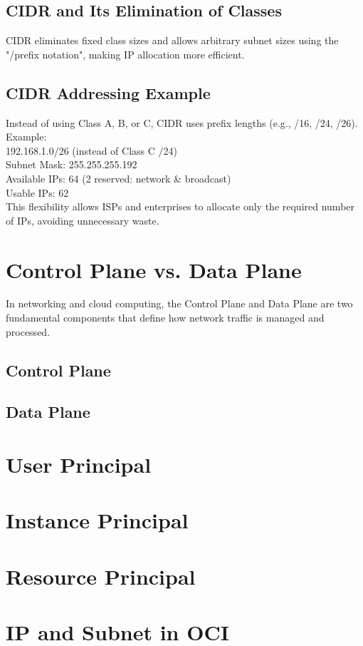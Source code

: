 \documentclass[../main.tex]{subfiles}
\begin{document}
\subsection{CIDR and Its Elimination of Classes}
CIDR eliminates fixed class sizes and allows arbitrary subnet sizes using the "/prefix notation", making IP allocation more efficient.
\subsection{CIDR Addressing Example}
Instead of using Class A, B, or C, CIDR uses prefix lengths (e.g., /16, /24, /26).
Example:\\
192.168.1.0/26 (instead of Class C /24)\\
Subnet Mask: 255.255.255.192\\
Available IPs: 64 (2 reserved: network \& broadcast)\\
Usable IPs: 62\\
This flexibility allows ISPs and enterprises to allocate only the required number of IPs, avoiding unnecessary waste.

\section{Control Plane vs. Data Plane}
In networking and cloud computing, the Control Plane and Data Plane are two fundamental components that define how network traffic is managed and processed.
\subsection{Control Plane}
\subsection{Data Plane}

\section{User Principal}
\section{Instance Principal}
\section{Resource Principal}
\section{IP and Subnet in OCI}

\end{document}
